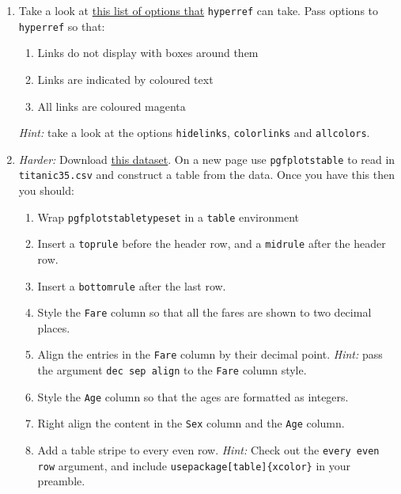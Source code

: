 \documentclass{article}
\begin{document}
\begin{enumerate}[label=\color{purple}\theenumi.]
  \item Take a look at
    \href{tftp://tug.ctan.org/pub/tex-archive/macros/latex/contrib/hyperref/doc/options.pdf}%
    {this list of options that} \texttt{hyperref} can take. Pass options to 
    \texttt{hyperref} so that:
    \begin{enumerate}
      \item Links do not display with boxes around them
      \item Links are indicated by coloured text
      \item All links are coloured magenta
    \end{enumerate}
    \textsl{Hint:} take a look at the options \texttt{hidelinks},
    \texttt{colorlinks} and \texttt{allcolors}.

  \item \emph{Harder:} Download
    \href{https://jwalton.info/assets/teaching/latex/titanic.csv}%
    {this dataset}. On a new page use \texttt{pgfplotstable} to read in 
    \texttt{titanic35.csv} and construct a table from the data. Once you have
    this then you should:
    \begin{enumerate}
      \item Wrap \texttt{pgfplotstabletypeset} in a \texttt{table} environment
      \item Insert a \texttt{toprule} before the header row, and a
        \texttt{midrule} after the header row.
      \item Insert a \texttt{bottomrule} after the last row.
      \item Style the \texttt{Fare} column so that all the fares are shown to
        two decimal places.
      \item Align the entries in the \texttt{Fare} column by their decimal
        point. \emph{Hint:} pass the argument \texttt{dec sep align} to the 
        \texttt{Fare} column style.
      \item Style the \texttt{Age} column so that the ages are formatted as
        integers.
      \item Right align the content in the \texttt{Sex} column and the
        \texttt{Age} column.
      \item Add a table stripe to every even row. \emph{Hint:} Check out the 
        \texttt{every even row} argument, and include 
        \texttt{\tb usepackage[table]\{xcolor\}} in your preamble.
    \end{enumerate}
\end{enumerate}
\end{document}
